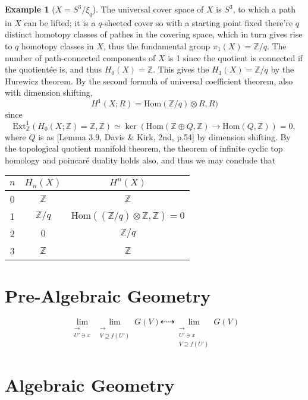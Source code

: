 \documentclass[10pt]{report}
\theoremstyle{definition}
\newtheorem{example}{Example}
\begin{document}
\begin{example}[$X={S^3}\big/{\xi_q}$]
The universal cover space of $X$ is $S^3$, to which a path in $X$ can be lifted; it is a $q$-sheeted cover so with a starting point fixed there're $q$ distinct homotopy classes of pathes in the covering space, which in turn gives rise to $q$ homotopy classes in $X$, thus the fundamental group $\pi_1(X)=\mathbb{Z}/q$. The number of path-connected components of $X$ is 1 since the quotient is connected if the quotient\'ee is, and thus $H_0(X)=\mathbb{Z}$. This gives the $H_1(X)=\mathbb{Z}/q$ by the Hurewicz theorem. By the second formula of universal coefficient theorem, also with dimension shifting, $$H^1(X;R)=\mathrm{Hom}(\mathbb{Z}/q)\otimes R,R)$$ since $$\mathrm{Ext}_\mathbb{Z}^1(H_{0}(X;\mathbb{Z})=\mathbb{Z},\mathbb{Z})\simeq\ker(\mathrm{Hom}(\mathbb{Z}\oplus Q,\mathbb{Z})\to\mathrm{Hom}(Q,\mathbb{Z}))=0,$$ where $Q$ is as [Lemma 3.9, Davis \& Kirk, 2nd, p.54] by dimension shifting. By the topological quotient manifold theorem, the theorem of infinite cyclic top homology and poincar\'e duality holds also, and thus we may conclude that
\begin{center}
\begin{tabular}{|c|c|c|}
  \hline
  $n$ & $H_n(X)$ & $H^n(X)$ \\
  \hline
  0 & $\mathbb{Z}$ & $\mathbb{Z}$ \\
  \hline
  1 & $\mathbb{Z}/q$ & $\mathrm{Hom}((\mathbb{Z}/q)\otimes\mathbb{Z},\mathbb{Z})=0$ \\
  \hline
  2 & $0$ & $\mathbb{Z}/q$ \\
  \hline
  3 & $\mathbb{Z}$ & $\mathbb{Z}$ \\
  \hline
\end{tabular}
\end{center}
\end{example}

\chapter{Pre-Algebraic Geometry}

$$\lim_{\substack{\rightarrow\\U'\ni x}}\lim_{\substack{\rightarrow\\V\supseteq f(U')}}G(V)\dashleftarrow\dashrightarrow\lim_{\substack{\rightarrow\\U'\ni x\\V\supseteq f(U')}}G(V)$$

\chapter{Algebraic Geometry}
\end{document}
